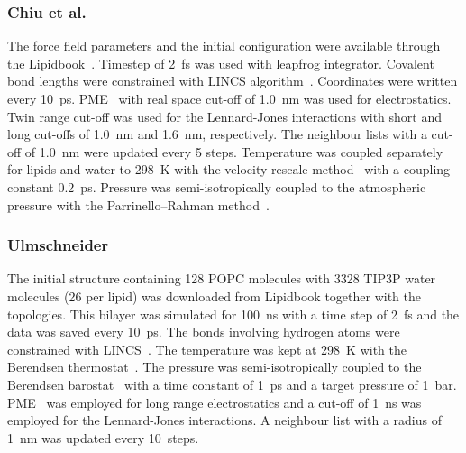 \documentclass[pre,aps,floatfix,authordate1-4,twocolumn]{revtex4-1}
\begin{document}

\subsubsection{Chiu et al.}
The force field parameters and the initial configuration were available through the Lipidbook~\cite{domanski10}.
Timestep of 2~fs was used with leapfrog integrator. Covalent bond lengths were constrained with LINCS algorithm~\cite{hess97,hess07}. 
Coordinates were written every 10~ps. PME~\cite{darden93,essman95} with real space cut-off of 1.0~nm was used 
for electrostatics. Twin range cut-off was used for the Lennard-Jones interactions with short and long cut-offs of 1.0~nm and 1.6~nm, respectively.
The neighbour lists with a cut-off of 1.0~nm were updated every 5 steps. Temperature was coupled separately
for lipids and water to 298~K with the velocity-rescale method~\cite{bussi07} with a coupling constant 0.2~ps.
Pressure was semi-isotropically coupled to the atmospheric pressure with the Parrinello--Rahman method~\cite{parrinello81}.

\subsubsection{Ulmschneider}
The initial structure containing 128 POPC molecules with 3328 TIP3P water~\cite{jorgensen83} molecules (26 per lipid) was downloaded from Lipidbook \cite{domanski10} 
together with the topologies. This bilayer was simulated for 100~ns with a time step of 2~fs and the data was saved every 10~ps. The bonds involving hydrogen atoms were 
constrained with LINCS~\cite{hess97,hess07}. The temperature was kept at 298~K with the Berendsen thermostat~\cite{berendsen84}. The pressure was semi-isotropically coupled to the Berendsen 
barostat~\cite{berendsen84} with a time constant of 1~ps and a target pressure of 1~bar. PME~\cite{darden93,essman95} was employed for long range electrostatics and a cut-off of 1~ns was employed for 
the Lennard-Jones interactions. A neighbour list with a radius of 1~nm was updated every 10~steps. 
\end{document}

